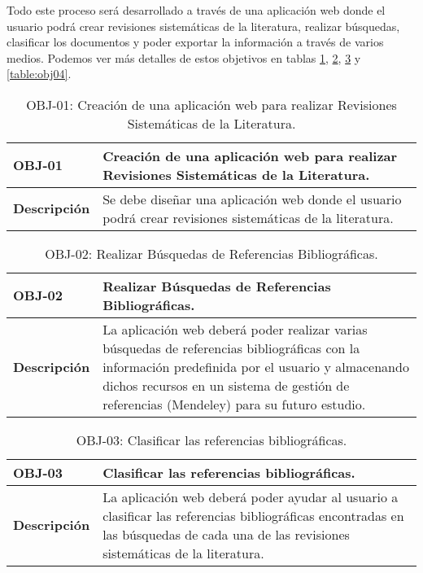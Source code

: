 Todo este proceso será desarrollado a través de una aplicación web donde el usuario podrá crear revisiones sistemáticas de la literatura, realizar búsquedas, clasificar los documentos y poder exportar la información a través de varios medios. Podemos ver más detalles de estos objetivos en tablas \ref{table:obj01}, \ref{table:obj02}, \ref{table:obj03} y \ref{table:obj04}.

\begin{table}[!hbt]
	\begin{center}
		\begin{tabular}{|p{2cm}|p{13cm}|}
			\hline
			\textbf{OBJ-01} & Creación de una aplicación web para realizar Revisiones Sistemáticas de la Literatura.\\
			\hline
			\textbf{Descripción} & Se debe diseñar una aplicación web donde el usuario podrá crear revisiones sistemáticas de la literatura.\\
			\hline
		\end{tabular}
		\caption{OBJ-01: Creación de una aplicación web para realizar Revisiones Sistemáticas de la Literatura.}
		\label{table:obj01}
	\end{center}
\end{table}

\begin{table}[!hbt]
	\begin{center}
		\begin{tabular}{|p{2cm}|p{13cm}|}
			\hline
			\textbf{OBJ-02} & Realizar Búsquedas de Referencias Bibliográficas.\\
			\hline
			\textbf{Descripción} & La aplicación web deberá poder realizar varias búsquedas de referencias bibliográficas con la información predefinida por el usuario y almacenando dichos recursos en un sistema de gestión de referencias (Mendeley) para su futuro estudio.\\
			\hline
		\end{tabular}
		\caption{OBJ-02: Realizar Búsquedas de Referencias Bibliográficas.}
		\label{table:obj02}
	\end{center}
\end{table}

\begin{table}[!hbt]
	\begin{center}
		\begin{tabular}{|p{2cm}|p{13cm}|}
			\hline
			\textbf{OBJ-03} & Clasificar las referencias bibliográficas.\\
			\hline
			\textbf{Descripción} & La aplicación web deberá poder ayudar al usuario a clasificar las referencias bibliográficas encontradas en las búsquedas de cada una de las revisiones sistemáticas de la literatura.\\
			\hline
		\end{tabular}
		\caption{OBJ-03: Clasificar las referencias bibliográficas.}
		\label{table:obj03}
	\end{center}
\end{table}

